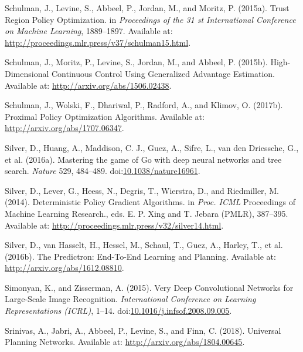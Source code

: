 \documentclass[
  letterpaper,
  DIV=11,
  numbers=noendperiod]{scrreprt}
\newlength{\cslhangindent}
\newlength{\cslentryspacingunit} %
\newenvironment{CSLReferences}[2] %
 {%
  \setlength{\parindent}{0pt}
  \ifodd #1
  \let\oldpar\par
  \def\par{\hangindent=\cslhangindent\oldpar}
  \fi
  \setlength{\parskip}{#2\cslentryspacingunit}
 }%
 {}
\begin{document}
\begin{CSLReferences}{1}{0}
\leavevmode{}%
Schulman, J., Levine, S., Abbeel, P., Jordan, M., and Moritz, P.
(2015a). Trust {Region Policy Optimization}. in \emph{Proceedings of the
31 st {International Conference} on {Machine Learning}}, 1889--1897.
Available at: \url{http://proceedings.mlr.press/v37/schulman15.html}.

\leavevmode{}%
Schulman, J., Moritz, P., Levine, S., Jordan, M., and Abbeel, P.
(2015b). High-{Dimensional Continuous Control Using Generalized
Advantage Estimation}. Available at:
\url{http://arxiv.org/abs/1506.02438}.

\leavevmode{}%
Schulman, J., Wolski, F., Dhariwal, P., Radford, A., and Klimov, O.
(2017b). Proximal {Policy Optimization Algorithms}. Available at:
\url{http://arxiv.org/abs/1707.06347}.

\leavevmode{}%
Silver, D., Huang, A., Maddison, C. J., Guez, A., Sifre, L., van den
Driessche, G., et al. (2016a). Mastering the game of {Go} with deep
neural networks and tree search. \emph{Nature} 529, 484--489.
doi:\href{https://doi.org/10.1038/nature16961}{10.1038/nature16961}.

\leavevmode{}%
Silver, D., Lever, G., Heess, N., Degris, T., Wierstra, D., and
Riedmiller, M. (2014). Deterministic {Policy Gradient Algorithms}. in
\emph{Proc. {ICML}} Proceedings of {Machine Learning Research}., eds. E.
P. Xing and T. Jebara ({PMLR}), 387--395. Available at:
\url{http://proceedings.mlr.press/v32/silver14.html}.

\leavevmode{}%
Silver, D., van Hasselt, H., Hessel, M., Schaul, T., Guez, A., Harley,
T., et al. (2016b). The {Predictron}: {End-To-End Learning} and
{Planning}. Available at: \url{http://arxiv.org/abs/1612.08810}.

\leavevmode{}%
Simonyan, K., and Zisserman, A. (2015). Very {Deep Convolutional
Networks} for {Large-Scale Image Recognition}. \emph{International
Conference on Learning Representations (ICRL)}, 1--14.
doi:\href{https://doi.org/10.1016/j.infsof.2008.09.005}{10.1016/j.infsof.2008.09.005}.

\leavevmode{}%
Srinivas, A., Jabri, A., Abbeel, P., Levine, S., and Finn, C. (2018).
Universal {Planning Networks}. Available at:
\url{http://arxiv.org/abs/1804.00645}.


\end{CSLReferences}
\end{document}
